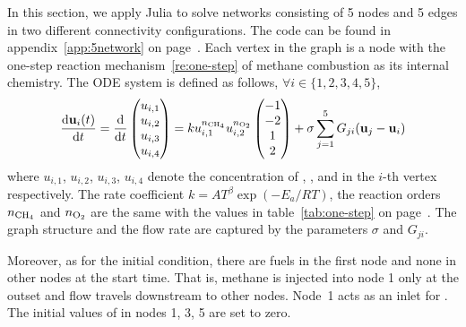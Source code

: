 In this section, we apply Julia to solve networks consisting of 5 nodes and 5 edges in two different connectivity configurations. The code can be found in appendix~\ref{app:5network} on page~\pageref{app:5network}. Each vertex in the graph is a node with the one-step reaction mechanism~\eqref{re:one-step} of methane combustion as its internal chemistry. The ODE system is defined as follows, $\forall i \in \{1,2,3,4,5\}$,
\begin{equation}
    \frac{\mathrm d \mathbf u_i(t)}{\mathrm d t} = \frac{\mathrm d}{\mathrm d t}
    \begin{pmatrix}
        u_{i,1} \\
        u_{i,2} \\
        u_{i,3} \\
        u_{i,4}
    \end{pmatrix}
    = k u_{i,1}^{n_{\ce{CH4}}} u_{i,2}^{n_{\ce{O2}}}
    \begin{pmatrix}
        -1 \\
        -2 \\
        1 \\
        2
    \end{pmatrix}
    + \sigma \sum_{j=1}^5 G_{ji} (\mathbf u_j - \mathbf u_i)
\end{equation}
where $u_{i,1}$, $u_{i,2}$, $u_{i,3}$, $u_{i,4}$ denote the concentration of , ,  and  in the $i$-th vertex respectively. The rate coefficient $k = A T^\beta \exp(- E_a / R T)$, the reaction orders $n_{\ce{CH4}}$ and $n_{\ce{O2}}$ are the same with the values in table~\ref{tab:one-step} on page~\pageref{tab:one-step}. The graph structure and the flow rate are captured by the parameters $\sigma$ and $G_{ji}$.

Moreover, as for the initial condition, there are fuels in the first node and none in other nodes at the start time. That is, methane is injected into node 1 only at the outset and flow travels downstream to other nodes. Node~1 acts as an inlet for . The initial values of  in nodes 1, 3, 5 are set to zero.

